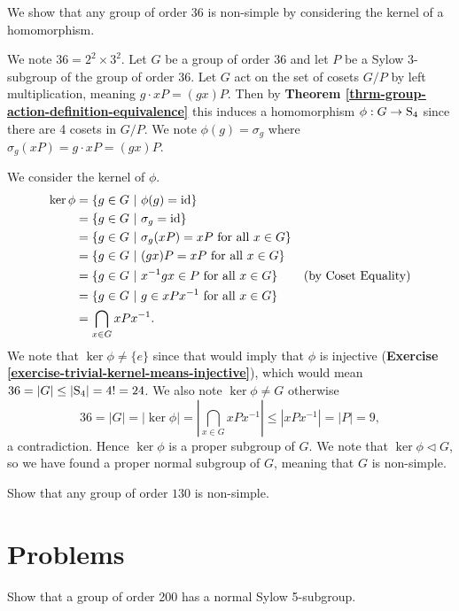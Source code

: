 \begin{example}\label{example-using-kernel-to-show-non-simple}
    We show that any group of order 36 is non-simple by considering the kernel of a homomorphism.

    We note $36 = 2^2 \times 3^2$. Let $G$ be a group of order 36 and let $P$ be a Sylow 3-subgroup of the group of order 36. Let $G$ act on the set of cosets $G/P$ by left multiplication, meaning $g \cdot xP = (gx)P$. Then by \textbf{Theorem \ref{thrm-group-action-definition-equivalence}} this induces a homomorphism $\phi: G \to \mathrm{S}_{4}$ since there are 4 cosets in $G/P$. We note $\phi(g) = \sigma_g$ where $\sigma_g(xP) = g\cdot xP = (gx)P$.

    We consider the kernel of $\phi$.
    \begin{align*}
        \ker\phi &= \{g \in G \ | \  \phi(g) = \mathrm{id}\}\\
        &= \{g \in G \ | \  \sigma_g = \mathrm{id}\}\\
        &= \{g \in G \ | \  \sigma_g(xP) = xP \text{ for all } x \in G\}\\
        &= \{g \in G \ | \  (gx)P = xP \text{ for all } x \in G\}\\
        &= \{g \in G \ | \  x^{-1}gx \in P \text{ for all } x \in G\} & (\text{by Coset Equality})\\
        &= \{g \in G \ | \  g \in xPx^{-1} \text{ for all } x \in G\}\\
        &= \bigcap_{x \in G} xPx^{-1}.
    \end{align*}
    We note that $\ker\phi \neq \{e\}$ since that would imply that $\phi$ is injective (\textbf{Exercise \ref{exercise-trivial-kernel-means-injective}}), which would mean $36 = |G| \leq |\mathrm{S}_{4}| = 4! = 24$. We also note $\ker\phi \neq G$ otherwise
    \[
        36 = |G| = |\ker\phi| = \left|\bigcap_{x \in G} xPx^{-1}\right| \leq |xPx^{-1}| = |P| = 9,
    \]
    a contradiction. Hence $\ker\phi$ is a proper subgroup of $G$. We note that $\ker\phi \lhd G$, so we have found a proper normal subgroup of $G$, meaning that $G$ is non-simple.
\end{example}

\begin{exercise}
    Show that any group of order $130$ is non-simple.
\end{exercise}

\newpage

\section{Problems}
\begin{problem}
    Show that a group of order 200 has a normal Sylow 5-subgroup.
\end{problem}

